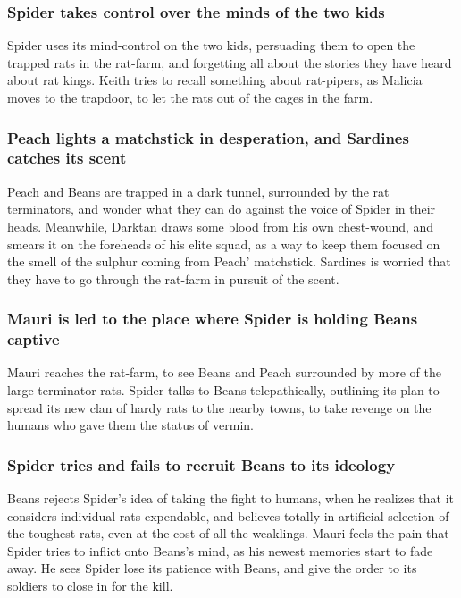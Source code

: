 \subsubsection{\Gls{Spider} takes control over the minds of the two kids}
\Gls{Spider} uses its mind-control on the two kids, persuading them to open the trapped rats in the
rat-farm, and forgetting all about the stories they have heard about rat kings. \Gls{Keith} tries
to recall something about rat-pipers, as \Gls{Malicia} moves to the trapdoor, to let the rats out
of the cages in the farm.

\subsubsection{\Gls{Peach} lights a matchstick in desperation, and \Gls{Sardines} catches its scent}
\Gls{Peach} and \Gls{Beans} are trapped in a dark tunnel, surrounded by the rat terminators, and
wonder what they can do against the voice of \Gls{Spider} in their heads. Meanwhile, \Gls{Darktan}
draws some blood from his own chest-wound, and smears it on the foreheads of his elite squad, as a
way to keep them focused on the smell of the sulphur coming from \Gls{Peach}' matchstick.
\Gls{Sardines} is worried that they have to go through the rat-farm in pursuit of the scent.

\subsubsection{\Gls{Mauri} is led to the place where \Gls{Spider} is holding \Gls{Beans} captive}
\Gls{Mauri} reaches the rat-farm, to see \Gls{Beans} and \Gls{Peach} surrounded by more of the
large terminator rats. \Gls{Spider} talks to \Gls{Beans} telepathically, outlining its plan to
spread its new clan of hardy rats to the nearby towns, to take revenge on the humans who gave them
the status of vermin.

\subsubsection{\Gls{Spider} tries and fails to recruit \Gls{Beans} to its ideology}
\Gls{Beans} rejects \Gls{Spider}'s idea of taking the fight to humans, when he realizes that it
considers individual rats expendable, and believes totally in artificial selection of the toughest
rats, even at the cost of all the weaklings. \Gls{Mauri} feels the pain that \Gls{Spider} tries to
inflict onto \Gls{Beans}'s mind, as his newest memories start to fade away. He sees \Gls{Spider}
lose its patience with \Gls{Beans}, and give the order to its soldiers to close in for the kill.

